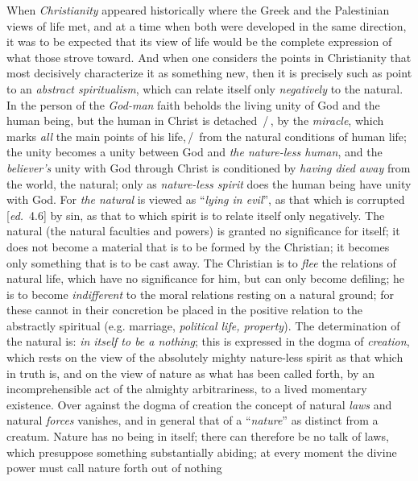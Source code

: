 \documentclass[12pt,a4paper,openany]{book}
\newcommand{\kpage}[1]{\marginnote{\footnotesize\textit{[#1]}}}
\newcommand{\ed}[1]{{\small[\textit{ed.}\ #1]}}
\newcommand{\ins}[1]{\,/\,#1\,/\,}
\begin{document}
When \emph{Christianity} appeared historically where the Greek and the
Palestinian views of life met, and at a time when both were
developed in the same direction, it was to be expected that its view of life
would be the complete expression of what those strove toward.
And when one considers the points in Christianity that most decisively\kpage{89}
characterize it as something new, then it is precisely such as
point to an \emph{abstract spiritualism}, which can relate itself only \emph{negatively}
to the natural. In the person of the \emph{God-man} faith beholds the living
unity of God and the human being, but the human in Christ
is detached \ins{, by the \emph{miracle}, which marks \emph{all} the main points of his
life,} from the natural conditions of human life; the unity becomes
a unity between God and \emph{the nature-less human}, and the \emph{believer's}
unity with God through Christ is conditioned by \emph{having died away} from
the world, the natural; only as \emph{nature-less spirit} does the human being have unity
with God. For \emph{the natural} is viewed as ``\emph{lying in evil}'', as that
which is corrupted \ed{4.6} by sin, as that to which spirit is to relate itself
only negatively. The natural (the natural faculties and
powers) is granted no significance for itself; it does not become a
material that is to be formed by the Christian; it becomes only something that
is to be cast away. The Christian is to \emph{flee} the relations of natural life,
which have no significance for him, but can only become defiling;
he is to become \emph{indifferent} to the moral relations resting on a natural
ground; for these cannot in their concretion be placed in
the positive relation to the abstractly spiritual (e.g. marriage,
\emph{political life, property}). The determination of the natural is: \emph{in itself to be a nothing};
this is expressed in the dogma of \emph{creation}, which rests on the view of the
absolutely mighty nature-less spirit as that which in truth is, and
on the view of nature as what has been called forth, by an incomprehensible act of the
almighty arbitrariness, to a lived momentary existence.
Over against the dogma of creation the concept of natural \emph{laws}
and natural \emph{forces} vanishes, and in general that of a ``\emph{nature}'' as distinct from a
creatum. Nature has no being in itself; there can therefore be no
talk of laws, which presuppose something substantially abiding; at every moment
the divine power must call nature forth out of nothing
\end{document}
